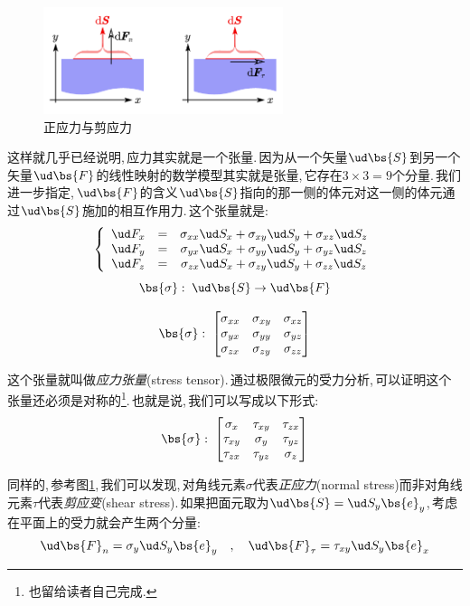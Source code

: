 \begin{figure}
\centering
\includegraphics[width=7cm]{image/6-7-2.png}
\caption{正应力与剪应力}\label{6-7-2}
\end{figure}
这样就几乎已经说明,\,应力其实就是一个张量.\,因为从一个矢量$\ud \bs{S}$到另一个矢量$\ud \bs{F}$的线性映射的数学模型其实就是张量,\,它存在$3\times 3=9$个分量.\,我们进一步指定,\,$\ud \bs{F}$的含义$\ud \bs{S}$指向的那一侧的体元对这一侧的体元通过$\ud \bs{S}$施加的相互作用力.\,这个张量就是:
\[\left\{\begin{array}{ccc}\ud F_x &= & \sigma_{xx} \ud S_x + \sigma_{xy} \ud S_y+\sigma_{xz} \ud S_z \\ \ud F_y&= & \sigma_{yx} \ud S_x + \sigma_{yy} \ud S_y+\sigma_{yz} \ud S_z \\ \ud F_z &= & \sigma_{zx} \ud S_x + \sigma_{zy} \ud S_y+\sigma_{zz} \ud S_z \end{array}\right.\]
\[\bs{\sigma}:\; \ud \bs{S}\rightarrow \ud \bs{F}\]

\[\bs{\sigma}:\; \begin{bmatrix}\sigma_{xx}&\sigma_{xy}&\sigma_{xz}\\\sigma_{yx}&\sigma_{yy}&\sigma_{yz}\\\sigma_{zx}&\sigma_{zy}&\sigma_{zz}\end{bmatrix}\]

这个张量就叫做\emph{应力张量}(stress tensor).\,通过极限微元的受力分析,\,可以证明这个张量还必须是对称的\footnote{也留给读者自己完成.}.\,也就是说,\,我们可以写成以下形式:
\[\bs{\sigma}:\; \begin{bmatrix}\sigma_{x}&\tau_{xy}&\tau_{zx}\\\tau_{xy}&\sigma_{y}&\tau_{yz}\\\tau_{zx}&\tau_{yz}&\sigma_{z}\end{bmatrix}\]

同样的,\,参考图\ref{6-7-2},\,我们可以发现,\,对角线元素$\sigma$代表\emph{正应力}(normal stress)而非对角线元素$\tau$代表\emph{剪应变}(shear stress).\,如果把面元取为$\ud\bs{S}=\ud S_y\bs{e}_y$,\,考虑在平面上的受力就会产生两个分量:
\[\ud \bs{F}_n=\sigma_y \ud S_y\bs{e}_y\quad,\quad\ud \bs{F}_{\tau}=\tau_{xy} \ud S_y\bs{e}_x\]

